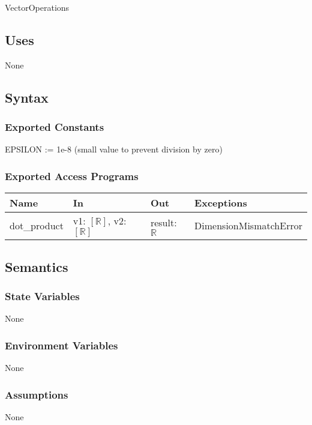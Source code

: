 \documentclass[12pt, titlepage]{article}
\begin{document}
VectorOperations

\subsection{Uses}
None

\subsection{Syntax}

\subsubsection{Exported Constants}
EPSILON := 1e-8 (small value to prevent division by zero)
\subsubsection{Exported Access Programs}

\begin{center}
\begin{tabular}{p{2cm} p{4cm} p{4cm} p{4cm}}
\hline
\textbf{Name} & \textbf{In} & \textbf{Out} & \textbf{Exceptions} \\
\hline
dot\_product & v1: $[\mathbb{R}]$, v2: $[\mathbb{R}]$ & result: $\mathbb{R}$ & DimensionMismatchError \\

\hline
\end{tabular}
\end{center}

\subsection{Semantics}

\subsubsection{State Variables}
None

\subsubsection{Environment Variables}

None

\subsubsection{Assumptions}

None
\end{document}
